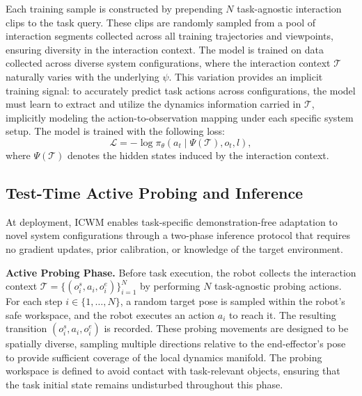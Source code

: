 \documentclass{llmxive}
\begin{document}
Each training sample is constructed by prepending $N$ task-agnostic interaction clips to the task query. 
These clips are randomly sampled from a pool of interaction segments collected across all training trajectories and viewpoints, ensuring diversity in the interaction context.
The model is trained on data collected across diverse system configurations, where the interaction context $\mathcal{T}$ naturally varies with the 
underlying $\psi$. This variation provides an implicit training signal: to accurately predict task actions across configurations, the model must learn to extract and utilize 
the dynamics information carried in $\mathcal{T}$, implicitly modeling the action-to-observation mapping under each specific system setup. The model is trained with 
the following loss:
\begin{equation}
\mathcal{L} = -\log \pi_\theta\left(a_t \mid \Psi\left(\mathcal{T}\right), o_t, l\right),
\end{equation}
where $\Psi\left(\mathcal{T}\right)$ denotes the hidden states induced by the 
interaction context. 


\subsection{Test-Time Active Probing and Inference}

At deployment, ICWM enables task-specific demonstration-free adaptation to novel system configurations through a two-phase inference protocol that requires no gradient updates, prior calibration, or knowledge of the target environment.

\textbf{Active Probing Phase.} 
Before task execution, the robot collects the interaction context $\mathcal{T} = \{\left(o^s_i, a_i, o^e_i\right)\}_{i=1}^N$ by performing $N$ task-agnostic probing actions. For each step $i \in \{1, \dots, N\}$, a random target pose is sampled within the robot's safe workspace, and the robot executes an action $a_i$ to reach it. The resulting transition $\left(o^s_i, a_i, o^e_i\right)$ is recorded. These probing movements are designed to be spatially diverse, sampling multiple directions relative to the end-effector's pose to provide sufficient coverage of the local dynamics manifold.
The probing workspace is defined to avoid contact with task-relevant objects, ensuring that the task initial state remains undisturbed throughout this phase.
\end{document}
